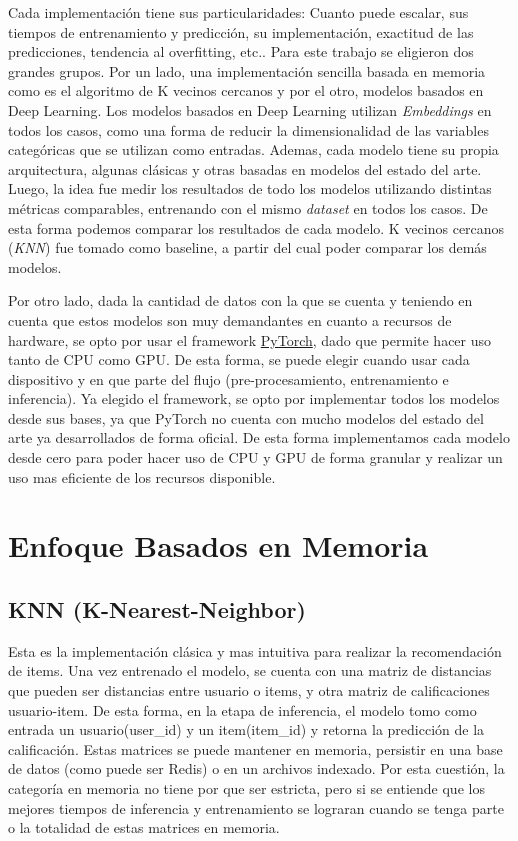 \documentclass[11pt,a4paper,twoside]{thesis}
\begin{document}
Cada implementación tiene sus particularidades:  Cuanto puede escalar, sus tiempos de entrenamiento y predicción, su implementación, exactitud de las predicciones, tendencia al overfitting, etc.. Para este trabajo se eligieron dos grandes grupos. Por un lado, una implementación sencilla basada en memoria como es el algoritmo de K vecinos cercanos y por el otro, modelos basados en Deep Learning. Los modelos basados en Deep Learning utilizan \textit{Embeddings} en todos los casos, como una forma de reducir la dimensionalidad de las variables categóricas que se utilizan como entradas. Ademas, cada modelo tiene su propia arquitectura, algunas clásicas y otras basadas en modelos del estado del arte. Luego, la idea fue medir los resultados de todo los modelos utilizando distintas métricas comparables, entrenando con el mismo \textit{dataset} en todos los casos. De esta forma podemos comparar los resultados de cada modelo. K vecinos cercanos (\textit{KNN}) fue tomado como baseline, a partir del cual poder comparar los demás modelos.

Por otro lado, dada la cantidad de datos con la que se cuenta y teniendo en cuenta que estos modelos son muy 
demandantes en cuanto a recursos de hardware, se opto por usar el framework \href{https://pytorch.org/}{PyTorch}, dado que permite hacer uso tanto de CPU como GPU. De esta forma, se puede elegir cuando usar cada dispositivo y en que parte del flujo (pre-procesamiento, entrenamiento e inferencia). Ya elegido el framework, se opto por implementar todos los modelos desde sus bases, ya que PyTorch no cuenta con mucho modelos del estado del arte ya desarrollados de forma oficial. De esta forma implementamos cada modelo desde cero para poder hacer uso de CPU y GPU de forma granular
y realizar un uso mas eficiente de los recursos disponible.

\section{Enfoque Basados en Memoria}

\subsection{KNN (K-Nearest-Neighbor)}

Esta es la implementación clásica y mas intuitiva para realizar la recomendación de items. Una vez entrenado el modelo, se cuenta con una matriz de distancias que pueden ser distancias entre usuario o items, y otra matriz de calificaciones usuario-item. De esta forma, en la etapa de inferencia, el modelo tomo como entrada un usuario(user\_id) y un item(item\_id) y retorna la predicción de la calificación. Estas matrices se puede mantener en memoria, persistir en una base de datos (como puede ser Redis) o en un archivos indexado. Por esta cuestión, la categoría en memoria no tiene por que ser estricta, pero si se entiende que los mejores tiempos de inferencia y entrenamiento se lograran cuando se tenga parte o la totalidad de estas matrices en memoria. 
\end{document}
